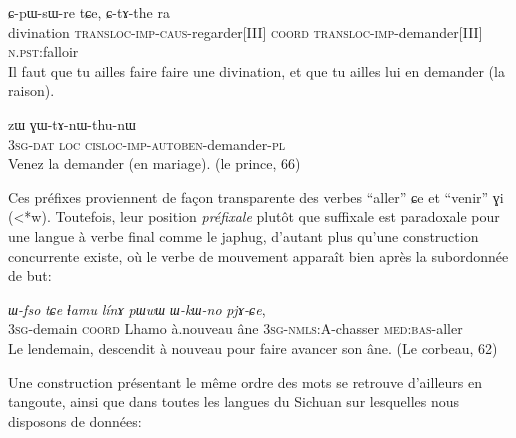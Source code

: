\documentclass[oldfontcommands,twoside,a4paper,11pt,draft]{memoir}
\newcommand{\ipa}[1]{{\phon #1}} %
\begin{document}
\begin{exe}
\ex 
\gll \ipa{mphrɯmɯ}	\ipa{ɕ-pɯ-sɯ-re}	\ipa{tɕe},	\ipa{ɕ-tɤ-the}	\ipa{ra} \\
 divination \textsc{transloc}-\textsc{imp}-\textsc{caus}-regarder[III] \textsc{coord} \textsc{transloc}-\textsc{imp}-demander[III] \textsc{n.pst}:falloir \\
 \glt Il faut que tu ailles faire faire une divination, et que tu ailles lui en demander (la raison).
 
 \ex
\gll 	\ipa{ɯ-ɕki}	\ipa{zɯ}	\ipa{ɣɯ-tɤ-nɯ-thu-nɯ}	\\
3\textsc{sg}-\textsc{dat}  \textsc{loc}  \textsc{cisloc}-\textsc{imp}-\textsc{autoben}-demander-\textsc{pl} \\
\glt 	Venez la demander (en mariage). (le prince, 66)
\end{exe}

Ces préfixes proviennent de façon transparente des verbes ``aller'' \ipa{ɕe} et ``venir'' \ipa{ɣi} (<*w). Toutefois, leur position \textit{préfixale} plutôt que suffixale est paradoxale pour une langue à verbe final comme le japhug, d'autant plus qu'une construction concurrente existe, où le verbe de mouvement apparaît bien après la subordonnée de but:
 
\begin{exe}
\ex 
\gll \textit{ɯ-fso}	\textit{tɕe}	\textit{ɬamu}	\textit{línɤ}	\textit{pɯwɯ}	\textit{ɯ-kɯ-no}	\textit{pjɤ-ɕe},	 \\
 3\textsc{sg}-demain \textsc{coord} Lhamo  à.nouveau âne 3\textsc{sg}-\textsc{nmls:A}-chasser \textsc{med:bas}-aller \\
\glt Le lendemain, descendit à nouveau pour faire avancer son âne. (Le corbeau, 62)
\end{exe}

Une construction présentant le même ordre des mots se retrouve d'ailleurs en tangoute, ainsi que dans toutes les langues du Sichuan sur lesquelles nous disposons de données:
\end{document}
